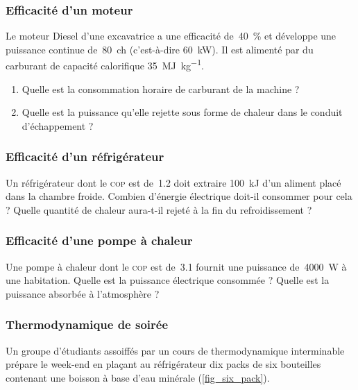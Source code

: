 \begin{boiboiboite}
	\propeau
	\propair
	\isentropiques
\end{boiboiboite}


\subsubsection{Efficacité d’un moteur}
\label{exo_efficacite_moteur}

	Le moteur Diesel d’une excavatrice a une efficacité de~\SI{40}{\percent} et développe une puissance continue de~\SI{80}{ch} (c’est-à-dire \SI{60}{\kilo\watt}). Il est alimenté par du carburant de capacité calorifique \SI{35}{\mega\joule\per\kilogram}.
	
	\begin{enumerate}
		\item Quelle est la consommation horaire de carburant de la machine ?
		\item Quelle est la puissance qu’elle rejette sous forme de chaleur dans le conduit d’échappement ?
	\end{enumerate}

\subsubsection{Efficacité d’un réfrigérateur}
\label{exo_efficacite_refrigerateur}

	Un réfrigérateur dont le \textsc{cop} est de~\num{1,2} doit extraire \SI{100}{\kilo\joule} d’un aliment placé dans la chambre froide. Combien d’énergie électrique doit-il consommer pour cela ? Quelle quantité de chaleur aura-t-il rejeté à la fin du refroidissement ?
	

\subsubsection{Efficacité d’une pompe à chaleur}
\label{exo_efficacite_thermopompe}

	Une pompe à chaleur dont le \textsc{cop} est de~\num{3,1} fournit une puissance de~\SI{4000}{\watt} à une habitation. Quelle est la puissance électrique consommée ? Quelle est la puissance absorbée à l’atmosphère ?


\subsubsection{Thermodynamique de soirée}
\label{exo_bieres}

	Un groupe d’étudiants assoiffés par un cours de thermodynamique interminable prépare le week-end en plaçant au réfrigérateur dix packs de six bouteilles contenant une boisson à base d’eau minérale (\cref{fig_six_pack}).
	

